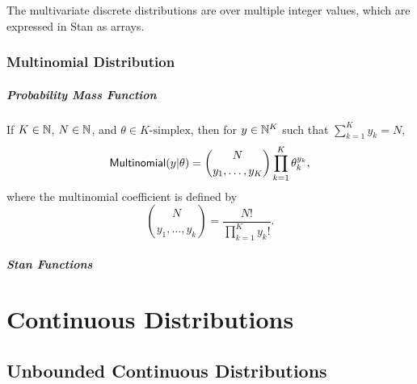 \noindent
The multivariate discrete distributions are over multiple integer
values, which are expressed in Stan as arrays.

\section{Multinomial Distribution}

\subsubsection{Probability Mass Function}

If $K \in \nats$, $N \in \nats$, and $\theta \in \mbox{$K$-simplex}$,
then for $y \in \nats^K$ such that $\sum_{k=1}^K y_k = N$,
%
\[
\distro{Multinomial}(y|\theta)
= \binom{N}{y_1,\ldots,y_K}
\prod_{k=1}^K \theta_k^{y_k},
\]
where the multinomial coefficient is defined by
\[
\binom{N}{y_1,\ldots,y_k}
= \frac{N!}{\prod_{k=1}^K y_k!}.
\]


\subsubsection{Stan Functions}

\begin{description}
%
\end{description}



\part{Continuous Distributions}\label{continuous-prob-functions.part}



\chapter{Unbounded Continuous Distributions}

